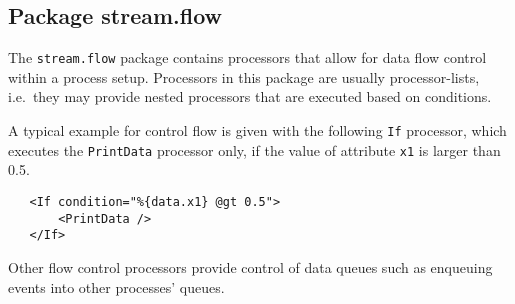 \subsection{Package stream.flow}

The \texttt{stream.flow} package contains processors that allow for data
flow control within a process setup. Processors in this package are
usually processor-lists, i.e.~they may provide nested processors that
are executed based on conditions.

A typical example for control flow is given with the following
\texttt{If} processor, which executes the \texttt{PrintData} processor
only, if the value of attribute \texttt{x1} is larger than 0.5.

\begin{verbatim}
   <If condition="%{data.x1} @gt 0.5">
       <PrintData />
   </If>
\end{verbatim}
Other flow control processors provide control of data queues such as
enqueuing events into other processes' queues.











